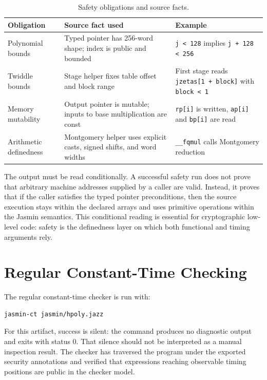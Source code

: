 \documentclass[10pt,twocolumn]{article}
\newcommand{\jasmin}{Jasmin}
\newcommand{\ct}{constant-time}
\begin{document}
\begin{table}[t]
\centering
\scriptsize
\setlength{\tabcolsep}{3pt}
\begin{tabular}{P{0.28\columnwidth}P{0.35\columnwidth}P{0.27\columnwidth}}
\toprule
Obligation & Source fact used & Example \\
\midrule
Polynomial bounds & Typed pointer has 256-word shape; index is public and
bounded & \texttt{j < 128} implies \texttt{j + 128 < 256} \\
Twiddle bounds & Stage helper fixes table offset and block range & First
stage reads \texttt{jzetas[1 + block]} with \texttt{block < 1} \\
Memory mutability & Output pointer is mutable; inputs to base multiplication
are const & \texttt{rp[i]} is written, \texttt{ap[i]} and \texttt{bp[i]} are
read \\
Arithmetic definedness & Montgomery helper uses explicit casts, signed
shifts, and word widths & \texttt{\_\_fqmul} calls Montgomery reduction \\
\bottomrule
\end{tabular}
\caption{Safety obligations and source facts.}
\label{tab:safety}
\end{table}

The output must be read conditionally.  A successful safety run does not prove
that arbitrary machine addresses supplied by a caller are valid.  Instead, it
proves that if the caller satisfies the typed pointer preconditions, then the
source execution stays within the declared arrays and uses primitive operations
within the \jasmin{} semantics.  This conditional reading is essential for
cryptographic low-level code: safety is the definedness layer on which both
functional and timing arguments rely.

\section{Regular Constant-Time Checking}

The regular \ct{} checker is run with:

\begin{lstlisting}[language=Shell,caption={Regular constant-time checker command.},label={lst:ctcmd}]
jasmin-ct jasmin/hpoly.jazz
\end{lstlisting}

For this artifact, success is silent: the command produces no diagnostic output
and exits with status 0.  That silence should not be interpreted as a manual
inspection result.  The checker has traversed the program under the exported
security annotations and verified that expressions reaching observable timing
positions are public in the checker model.
\end{document}
